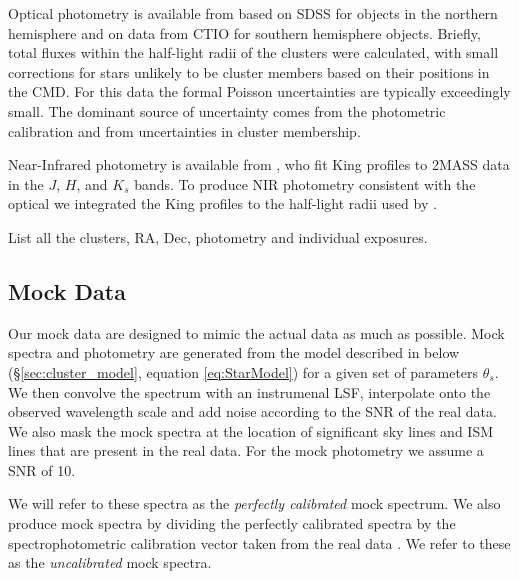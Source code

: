 \documentclass[iop,numberedappendix]{emulateapj}
\begin{document}
Optical photometry is available from \citet{vanderbeke14} based on
SDSS for objects in the northern hemisphere and on data from CTIO for
southern hemisphere objects.  Briefly, total fluxes within the half-light radii
of the clusters \citep{harris96} were calculated, with small
corrections for stars unlikely to be cluster members based on their
positions in the CMD. For this data the formal Poisson uncertainties
are typically exceedingly small.  The dominant source of uncertainty
comes from the photometric calibration and from uncertainties in
cluster membership.

Near-Infrared photometry is available from \citet{cohen07}, who fit
King profiles \citet{king62} to 2MASS data in the $J$, $H$, and $K_s$
bands.  To produce NIR photometry consistent with the optical we
integrated the King profiles to the half-light radii used by
\citet{vanderbeke14}.

\begin{table}[h!]
\caption{List all the clusters, RA, Dec, photometry and individual exposures.}
\end{table}


\subsection{Mock Data}
Our mock data are designed to mimic the actual data as much as
possible.  Mock spectra and photometry are generated from the model
described in below (\S\ref{sec:cluster_model}, equation
\ref{eq:StarModel}) for a given set of parameters $\theta_s$.  We then
convolve the spectrum with an instrumenal LSF, interpolate onto the
observed wavelength scale and add noise according to the SNR of the
real data.  We also mask the mock spectra at the location of
significant sky lines and ISM lines that are present in the real data.
For the mock photometry we assume a SNR of 10.

We will refer to these spectra as the \emph{perfectly calibrated} mock
spectrum. We also produce mock spectra by dividing the perfectly
calibrated spectra by the spectrophotometric calibration vector taken
from the real data \citep[][Fig\ref{fig:ggc_spectrum}]{schiavon05}.
We refer to these as the \emph{uncalibrated} mock spectra.
\end{document}
